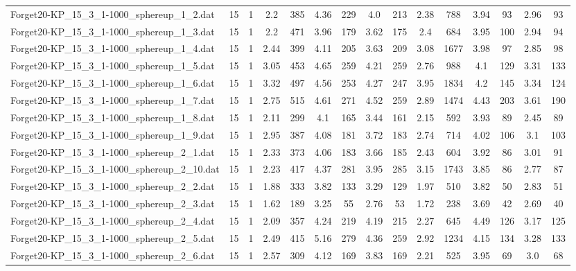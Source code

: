 \begin{table}[!ht]
{\begin{tabular}{lcccccccccccccc}
Forget20-KP\_15\_3\_1-1000\_sphereup\_1\_2.dat & 15 & 1 & 2.2 & 385 & 4.36 & 229 & 4.0 & 213 & 2.38 & 788 & 3.94 & 93 & 2.96 & 93 \\
Forget20-KP\_15\_3\_1-1000\_sphereup\_1\_3.dat & 15 & 1 & 2.2 & 471 & 3.96 & 179 & 3.62 & 175 & 2.4 & 684 & 3.95 & 100 & 2.94 & 94 \\
Forget20-KP\_15\_3\_1-1000\_sphereup\_1\_4.dat & 15 & 1 & 2.44 & 399 & 4.11 & 205 & 3.63 & 209 & 3.08 & 1677 & 3.98 & 97 & 2.85 & 98 \\
Forget20-KP\_15\_3\_1-1000\_sphereup\_1\_5.dat & 15 & 1 & 3.05 & 453 & 4.65 & 259 & 4.21 & 259 & 2.76 & 988 & 4.1 & 129 & 3.31 & 133 \\
Forget20-KP\_15\_3\_1-1000\_sphereup\_1\_6.dat & 15 & 1 & 3.32 & 497 & 4.56 & 253 & 4.27 & 247 & 3.95 & 1834 & 4.2 & 145 & 3.34 & 124 \\
Forget20-KP\_15\_3\_1-1000\_sphereup\_1\_7.dat & 15 & 1 & 2.75 & 515 & 4.61 & 271 & 4.52 & 259 & 2.89 & 1474 & 4.43 & 203 & 3.61 & 190 \\
Forget20-KP\_15\_3\_1-1000\_sphereup\_1\_8.dat & 15 & 1 & 2.11 & 299 & 4.1 & 165 & 3.44 & 161 & 2.15 & 592 & 3.93 & 89 & 2.45 & 89 \\
Forget20-KP\_15\_3\_1-1000\_sphereup\_1\_9.dat & 15 & 1 & 2.95 & 387 & 4.08 & 181 & 3.72 & 183 & 2.74 & 714 & 4.02 & 106 & 3.1 & 103 \\
Forget20-KP\_15\_3\_1-1000\_sphereup\_2\_1.dat & 15 & 1 & 2.33 & 373 & 4.06 & 183 & 3.66 & 185 & 2.43 & 604 & 3.92 & 86 & 3.01 & 91 \\
Forget20-KP\_15\_3\_1-1000\_sphereup\_2\_10.dat & 15 & 1 & 2.23 & 417 & 4.37 & 281 & 3.95 & 285 & 3.15 & 1743 & 3.85 & 86 & 2.77 & 87 \\
Forget20-KP\_15\_3\_1-1000\_sphereup\_2\_2.dat & 15 & 1 & 1.88 & 333 & 3.82 & 133 & 3.29 & 129 & 1.97 & 510 & 3.82 & 50 & 2.83 & 51 \\
Forget20-KP\_15\_3\_1-1000\_sphereup\_2\_3.dat & 15 & 1 & 1.62 & 189 & 3.25 & 55 & 2.76 & 53 & 1.72 & 238 & 3.69 & 42 & 2.69 & 40 \\
Forget20-KP\_15\_3\_1-1000\_sphereup\_2\_4.dat & 15 & 1 & 2.09 & 357 & 4.24 & 219 & 4.19 & 215 & 2.27 & 645 & 4.49 & 126 & 3.17 & 125 \\
Forget20-KP\_15\_3\_1-1000\_sphereup\_2\_5.dat & 15 & 1 & 2.49 & 415 & 5.16 & 279 & 4.36 & 259 & 2.92 & 1234 & 4.15 & 134 & 3.28 & 133 \\
Forget20-KP\_15\_3\_1-1000\_sphereup\_2\_6.dat & 15 & 1 & 2.57 & 309 & 4.12 & 169 & 3.83 & 169 & 2.21 & 525 & 3.95 & 69 & 3.0 & 68 \\

\end{tabular}}
\end{table}
